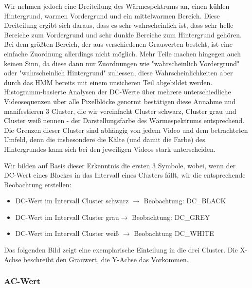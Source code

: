 Wir nehmen jedoch eine Dreiteilung des Wärmespektrums an, einen kühlen Hintergrund, warmen Vordergrund und ein mittelwarmen Bereich.
Diese Dreiteilung ergibt sich daraus, dass es sehr wahrscheinlich ist, dass sehr helle Bereiche zum Vordergrund und sehr dunkle Bereiche zum Hintergrund gehören.
Bei dem größten Bereich, der aus verschiedenen Grauwerten besteht, ist eine einfache Zuordnung allerdings nicht möglich. Mehr Teile machen hingegen auch keinen Sinn, da diese dann nur Zuordnungen wie "wahrscheinlich Vordergrund" oder "wahrscheinlich Hintergrund" zuliessen, diese Wahrscheinlichkeiten aber durch das HMM bereits mit einem unsicheren Teil abgebildet werden.
Histogramm-basierte Analysen der DC-Werte über mehrere unterschiedliche Videosequenzen über alle Pixelblöcke genormt bestätigen diese Annahme und manifestieren 3 Cluster, die wir vereinfacht Cluster schwarz, Cluster grau und Cluster weiß nennen - der Darstellungsfarbe des Wärmespektrums entsprechend.
Die Grenzen dieser Cluster sind abhängig von jedem Video und dem betrachteten Umfeld, denn die insbesondere die Kälte (und damit die Farbe) des Hintergrundes kann sich bei den jeweiligen Videos stark unterscheiden.


Wir bilden auf Basis dieser Erkenntnis die ersten 3 Symbole, wobei, wenn der DC-Wert eines Blockes in das Intervall eines Clusters fällt, wir die entsprechende Beobachtung erstellen:

\begin{itemize}
	\item DC-Wert im Intervall Cluster schwarz $\rightarrow$ Beobachtung: DC\_BLACK
	\item DC-Wert im Intervall Cluster grau$\rightarrow$ Beobachtung: DC\_GREY
	\item DC-Wert im Intervall Cluster weiß $\rightarrow$ Beobachtung DC\_WHITE
\end{itemize}

Das folgenden Bild zeigt eine exemplarische Einteilung in die drei Cluster.
 Die X-Achse beschreibt den Grauwert, die Y-Achse das Vorkommen.

\subsubsection{AC-Wert}

